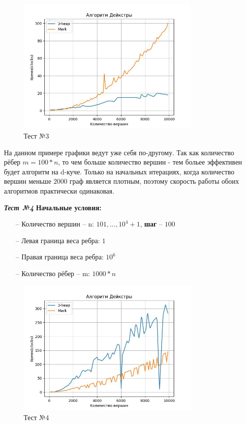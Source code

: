 \begin{text}
\begin{center}
\end{center}
\begin{figure}[h]
  \centering
  \includegraphics[width=0.8\textwidth]{pictures/3.jpeg}
  \caption{Тест №3}
  \label{fig:pict_3}
\end{figure}

На данном примере графики ведут уже себя по-другому. Так как количество рёбер $m = 100*n$, то чем больше количество вершин - тем больее эффективен будет алгоритм на d-куче. Только на начальных итерациях, когда количество вершин меньше $2000$ граф является плотным, поэтому скорость работы обоих алгоритмов практически одинаковая.\\
\newpage

\begin{center}
\textbf{\textit{Тест №4}}
\textbf{Начальные условия:}

\begin{enumerate}
	\item[--] Количество вершин -- n: $101,...,10^4 + 1$, \textbf{шаг} -- $100$
	\item[--] Левая граница веса ребра: $1$
	\item[--] Правая граница веса ребра: $10^6$
	\item[--] Количество рёбер -- m: $1000*n$ 
\end{enumerate}

\end{center}
\begin{figure}[h]
  \centering
  \includegraphics[width=0.8\textwidth]{pictures/4.jpeg}
  \caption{Тест №4}
  \label{fig:pict_4}
\end{figure}


\end{text}
